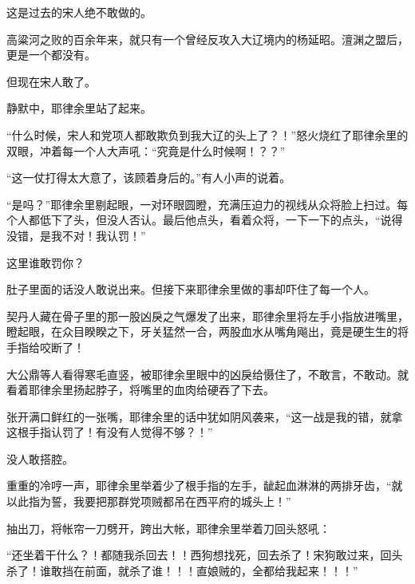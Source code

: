 这是过去的宋人绝不敢做的。

高粱河之败的百余年来，就只有一个曾经反攻入大辽境内的杨延昭。澶渊之盟后，更是一个都没有。

但现在宋人敢了。

静默中，耶律余里站了起来。

“什么时候，宋人和党项人都敢欺负到我大辽的头上了？！”怒火烧红了耶律余里的双眼，冲着每一个人大声吼：“究竟是什么时候啊！？？”

“这一仗打得太大意了，该顾着身后的。”有人小声的说着。

“是吗？”耶律余里剔起眼，一对环眼圆瞪，充满压迫力的视线从众将脸上扫过。每个人都低下了头，但没人否认。最后他点头，看着众将，一下一下的点头，“说得没错，是我不对！我认罚！”

这里谁敢罚你？

肚子里面的话没人敢说出来。但接下来耶律余里做的事却吓住了每一个人。

契丹人藏在骨子里的那一股凶戾之气爆发了出来，耶律余里将左手小指放进嘴里，瞪起眼，在众目睽睽之下，牙关猛然一合，两股血水从嘴角飚出，竟是硬生生的将手指给咬断了！

大公鼎等人看得寒毛直竖，被耶律余里眼中的凶戾给慑住了，不敢言，不敢动。就看着耶律余里扬起脖子，将嘴里的血肉给硬吞了下去。

张开满口鲜红的一张嘴，耶律余里的话中犹如阴风袭来，“这一战是我的错，就拿这根手指认罚了！有没有人觉得不够？！”

没人敢搭腔。

重重的冷哼一声，耶律余里举着少了根手指的左手，龇起血淋淋的两排牙齿，“就以此指为誓，我要把那群党项贼都吊在西平府的城头上！”

抽出刀，将帐帘一刀劈开，跨出大帐，耶律余里举着刀回头怒吼：

“还坐着干什么？！都随我杀回去！！西狗想找死，回去杀了！宋狗敢过来，回头杀了！谁敢挡在前面，就杀了谁！！！直娘贼的，全都给我起来！！！”

